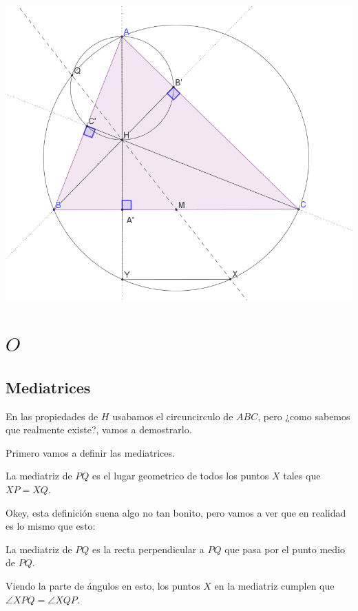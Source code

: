 \documentclass[11pt]{scrartcl}
\begin{document}
\begin{center}
        \includegraphics[scale=0.8]{PNAC9.png}
    \end{center}


\section{$O$}

\subsection{Mediatrices}

En las propiedades de $H$ usabamos el circuncirculo de $ABC$, pero ¿como sabemos que realmente existe?, vamos a demostrarlo.

Primero vamos a definir las mediatrices. 
\begin{definition}
    La mediatriz de $PQ$ es el lugar geometrico de todos los puntos $X$ tales que $XP=XQ$.
\end{definition}

Okey, esta definici\'on suena algo no tan bonito, pero vamos a ver que en realidad es lo mismo que esto:
\begin{claim}
    La mediatriz de $PQ$ es la recta perpendicular a $PQ$ que pasa por el punto medio de $PQ$. 
\end{claim}

\begin{remark*}
    Viendo la parte de \'angulos en esto, los puntos $X$ en la mediatriz cumplen que $\angle XPQ=\angle XQP$.
\end{remark*}
\end{document}
